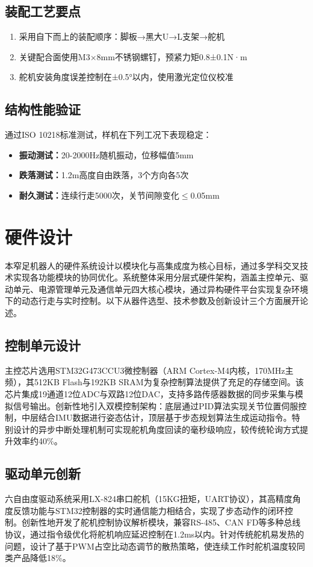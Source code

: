 \documentclass[a4paper,fontset=windows]{ctexart}
\providecommand{\tightlist}{%
  \setlength{\itemsep}{0pt}\setlength{\parskip}{0pt}}
\begin{document}
\subsection{装配工艺要点}
\begin{enumerate}[label=\arabic*)]
    \tightlist
    \item 采用自下而上的装配顺序：脚板→黑大U→L支架→舵机
    \item 关键配合面使用M3×8mm不锈钢螺钉，预紧力矩0.8±0.1N·m
    \item 舵机安装角度误差控制在±0.5°以内，使用激光定位仪校准
\end{enumerate}
\subsection{结构性能验证}
通过ISO 10218标准测试，样机在下列工况下表现稳定：
\begin{itemize}
    \tightlist
    \item \textbf{振动测试：}20-2000Hz随机振动，位移幅值5mm
    \item \textbf{跌落测试：}1.2m高度自由跌落，3个方向各5次
    \item \textbf{耐久测试：}连续行走5000次，关节间隙变化$\leq$0.05mm
\end{itemize}

\section{硬件设计}
本窄足机器人的硬件系统设计以模块化与高集成度为核心目标，通过多学科交叉技术实现各功能模块的协同优化。系统整体采用分层式硬件架构，涵盖主控单元、驱动单元、电源管理单元及通信单元四大核心模块，通过异构硬件平台实现复杂环境下的动态行走与实时控制。以下从器件选型、技术参数及创新设计三个方面展开论述。
\subsection{控制单元设计}
主控芯片选用STM32G473CCU3微控制器（ARM Cortex-M4内核，170MHz主频），其512KB Flash与192KB SRAM为复杂控制算法提供了充足的存储空间。该芯片集成19通道12位ADC与双路12位DAC，支持多路传感器数据的同步采集与模拟信号输出。创新性地引入双模控制架构：底层通过PID算法实现关节位置伺服控制，中层结合IMU数据进行姿态估计，顶层基于步态规划算法生成运动指令。特别设计的异步中断处理机制可实现舵机角度回读的毫秒级响应，较传统轮询方式提升效率约40\%。
\subsection{驱动单元创新}
六自由度驱动系统采用LX-824串口舵机（15KG扭矩，UART协议），其高精度角度反馈功能与STM32控制器的实时通信能力相结合，实现了步态动作的闭环控制。创新性地开发了舵机控制协议解析模块，兼容RS-485、CAN FD等多种总线协议，通过指令级优化将舵机响应延迟控制在1.2ms以内。针对传统舵机易发热的问题，设计了基于PWM占空比动态调节的散热策略，使连续工作时舵机温度较同类产品降低18\%。
\end{document}

